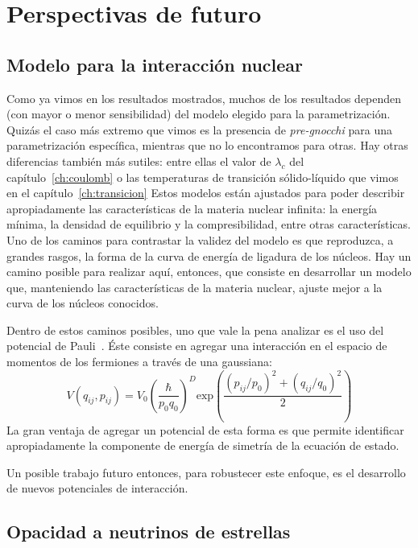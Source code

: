\section{Perspectivas de futuro}

\subsection{Modelo para la interacción nuclear}

Como ya vimos en los resultados mostrados, muchos de los resultados dependen (con mayor o menor sensibilidad) del modelo elegido para la parametrización.
Quizás el caso más extremo que vimos es la presencia de \emph{pre-gnocchi} para una parametrización específica, mientras que no lo encontramos para otras.
Hay otras diferencias también más sutiles: entre ellas el valor de $\lambda_c$ del capítulo~\ref{ch:coulomb} o las temperaturas de transición sólido-líquido que vimos en el capítulo~\ref{ch:transicion}
Estos modelos están ajustados para poder describir apropiadamente las características de la materia nuclear infinita: la energía mínima, la densidad de equilibrio y la compresibilidad, entre otras características.
Uno de los caminos para contrastar la validez del modelo es que reproduzca, a grandes rasgos, la forma de la curva de energía de ligadura de los núcleos.
Hay un camino posible para realizar aquí, entonces, que consiste en desarrollar un modelo que, manteniendo las características de la materia nuclear, ajuste mejor a la curva de los núcleos conocidos.

Dentro de estos caminos posibles, uno que vale la pena analizar es el uso del potencial de Pauli~\cite{dorso_classical_1987, dorso_classical_1988}.
Éste consiste en agregar una interacción en el espacio de momentos de los fermiones a través de una gaussiana:
\begin{equation}
  V(q_{ij}, p_{ij}) = V_0{\left(\frac{\hbar}{p_0q_0}\right)}^D\text{exp}{\left(\frac{{(p_{ij}/p_0)}^2 +{(q_{ij}/q_0)}^2}{2}\right)}
\end{equation}
La gran ventaja de agregar un potencial de esta forma es que permite identificar apropiadamente la componente de energía de simetría de la ecuación de estado.

Un posible trabajo futuro entonces, para robustecer este enfoque, es el desarrollo de nuevos potenciales de interacción.

\subsection{Opacidad a neutrinos de estrellas}

